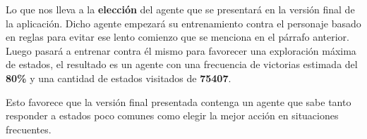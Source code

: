 \bigskip

Lo que nos lleva a la \textbf{elección} del agente que se presentará en la versión final de la aplicación. Dicho agente empezará su entrenamiento contra el personaje basado en reglas para evitar ese lento comienzo que se menciona en el párrafo anterior. Luego pasará a entrenar contra él mismo para favorecer una exploración máxima de estados, el resultado es un agente con una frecuencia de victorias estimada del \textbf{80\%} y una cantidad de estados visitados de \textbf{75407}.

\bigskip

Esto favorece que la versión final presentada contenga un agente que sabe tanto responder a estados poco comunes como elegir la mejor acción en situaciones frecuentes.


